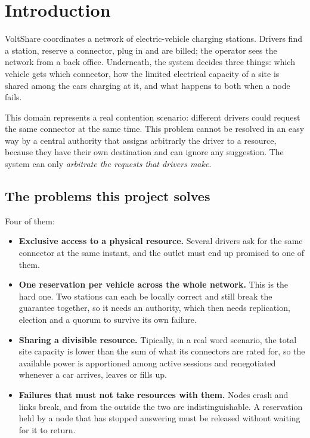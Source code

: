 \section{Introduction}
\label{sec:introduction}

VoltShare coordinates a network of electric-vehicle charging stations. Drivers find a
station, reserve a connector, plug in and are billed; the operator sees the network from a
back office. Underneath, the system decides three things: which vehicle gets which connector,
how the limited electrical capacity of a site is shared among the cars charging at it, and
what happens to both when a node fails.

This domain represents a real contention scenario: different drivers could request the same connector at the same time. This problem cannot be resolved in an easy way by a central authority that assigns arbitrarly the driver
to a resource, because they have their own destination and can ignore any suggestion.
The system can only \emph{arbitrate the requests that drivers make}.


\subsection{The problems this project solves}

Four of them:

\begin{itemize}
  \item \textbf{Exclusive access to a physical resource.} Several drivers ask for the same
        connector at the same instant, and the outlet must end up promised to one of them.
  \item \textbf{One reservation per vehicle across the whole network.} This is the hard one.
        Two stations can each be locally correct and still break the guarantee together, so
        it needs an authority, which then needs replication, election and a quorum to
        survive its own failure.
  \item \textbf{Sharing a divisible resource.} Tipically, in a real word scenario, the total site capacity is lower than the sum of what its
        connectors are rated for, so the available power is apportioned among active
        sessions and renegotiated whenever a car arrives, leaves or fills up.
  \item \textbf{Failures that must not take resources with them.} Nodes crash and links
        break, and from the outside the two are indistinguishable. A reservation held by a
        node that has stopped answering must be released without waiting for it to return.

\end{itemize}

